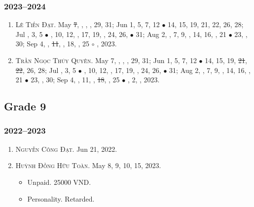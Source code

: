 \documentclass{article}
\begin{document}
\subsubsection{2023--2024}

\begin{enumerate}
	\item \textsc{Lê Tiến Đạt.} May \st{7}, , , , 29, 31; Jun 1, 5, 7, 12 $\bullet$ 14, 15, 19, 21, 22, 26, 28; Jul , 3, 5 $\bullet$ , 10, 12, , 17, 19, , 24, 26,  $\bullet$ 31; Aug 2, , 7, 9, , 14, 16, , 21 $\bullet$ 23, , 30; Sep 4, , \st{11}, , 18, , 25 $\circ$ , 2023. {\sf[Out]}
	\item \textsc{Trần Ngọc Thúy Quyên.} May 7, , , , 29, 31; Jun 1, 5, 7, 12 $\bullet$ 14, 15, 19, \st{21}, \st{22}, 26, 28; Jul , 3, 5 $\bullet$ , 10, 12, , 17, 19, , 24, 26,  $\bullet$ 31; Aug 2, , 7, 9, , 14, 16, , 21 $\bullet$ 23, , 30; Sep 4, , 11, , \st{18}, , 25 $\bullet$ , 2, , 2023.
\end{enumerate}


\subsection{Grade 9}

\subsubsection{2022--2023}

\begin{enumerate}
	\item \textsc{Nguyễn Công Đạt.} {\sf[In]} Jun 21, 2022. {\sf[Out]}
	\item \textsc{Huỳnh Đồng Hữu Toàn.} {\sf[In]} May 8, 9, 10, 15, 2023. {\sf[Out]}
	\begin{itemize}
		\item {\sf Unpaid.} 25000 VND.
		\item {\sf Personality.} Retarded.
	\end{itemize}
\end{enumerate}
\end{document}
